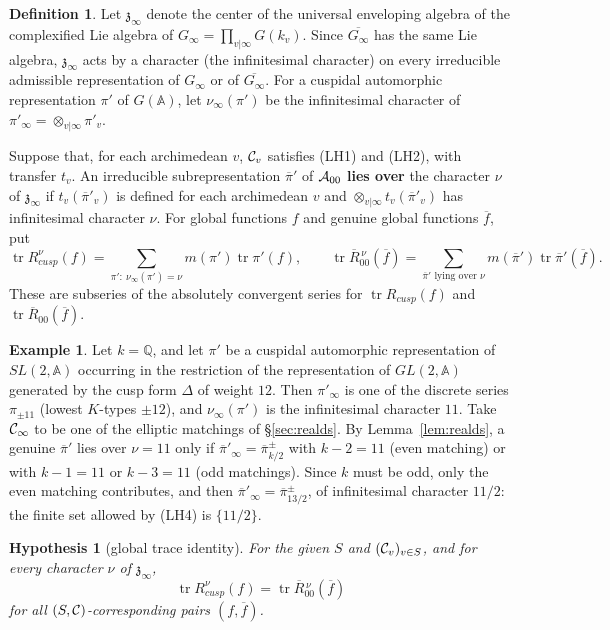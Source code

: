 \documentclass[12pt,letterpaper,openany]{book}
\theoremstyle{plain}
\newtheorem{hypothesis}[theorem]{Hypothesis}
\theoremstyle{definition}
\newtheorem{definition}[theorem]{Definition}
\newtheorem{example}[theorem]{Example}
\theoremstyle{remark}
\theoremstyle{remark}
\newcommand{\tr}{\operatorname{tr}}
\begin{document}
\begin{definition}\label{def:infchar}
Let $\mathfrak{z}_\infty$ denote the center of the universal enveloping
algebra of the complexified Lie algebra of
$G_\infty=\prod_{v|\infty}G(k_v)$. Since $\overline{G_\infty}$ has the same
Lie algebra, $\mathfrak{z}_\infty$ acts by a character (the infinitesimal
character) on every irreducible admissible representation of $G_\infty$
or of $\overline{G_\infty}$. For a cuspidal automorphic representation
$\pi'$ of $G({\mathbb{A}})$, let $\nu_\infty(\pi')$ be the infinitesimal
character of $\pi'_\infty=\otimes_{v|\infty}\pi'_v$.

Suppose that, for each archimedean $v$, ${\cal C}_v$ satisfies (LH1) and
(LH2), with transfer $t_v$. An irreducible subrepresentation
$\overline\pi'$ of ${\cal A}_{00}$ {\bf lies over} the
character $\nu$ of $\mathfrak{z}_\infty$ if $t_v(\overline\pi'_v)$ is
defined for each archimedean $v$ and $\otimes_{v|\infty}t_v(\overline\pi'_v)$
has infinitesimal character $\nu$. For global functions $f$ and genuine
global functions $\overline f$, put
\[
\tr R_{cusp}^\nu(f)=\sum_{\pi':\ \nu_\infty(\pi')=\nu}m(\pi')\tr\pi'(f),
\qquad
\tr \overline{R}{}_{00}^{\,\nu}(\overline f)=
\sum_{\overline\pi'\text{ lying over }\nu}m(\overline\pi')\tr\overline\pi'(\overline f).
\]
These are subseries of the absolutely convergent series for
$\tr R_{cusp}(f)$ and $\tr\overline R_{00}(\overline f)$.
\end{definition}

\begin{example}
Let $k={\mathbb Q}$, and let $\pi'$ be a cuspidal automorphic
representation of $SL(2,{\mathbb A})$ occurring in the restriction of the
representation of $GL(2,{\mathbb A})$ generated by the cusp form $\Delta$
of weight $12$. Then $\pi'_\infty$ is one of the discrete series
$\pi_{\pm11}$ (lowest $K$-types $\pm12$), and $\nu_\infty(\pi')$ is the
infinitesimal character $11$. Take ${\cal C}_\infty$ to be one of the
elliptic matchings of \S\ref{sec:realds}. By Lemma~\ref{lem:realds}, a
genuine $\overline\pi'$ lies over $\nu=11$ only if
$\overline\pi'_\infty=\overline\pi{}^{\pm}_{k/2}$ with $k-2=11$ (even
matching) or with $k-1=11$ or $k-3=11$ (odd matchings). Since $k$ must
be odd, only the even matching contributes, and then
$\overline\pi'_\infty=\overline\pi{}^{\pm}_{13/2}$, of infinitesimal
character $11/2$: the finite set allowed by (LH4) is $\{11/2\}$.
\end{example}

\begin{hypothesis}[global trace identity]\label{hyp:GH}
For the given $S$ and $({\cal C}_v)_{v\in S}$, and for every character
$\nu$ of $\mathfrak{z}_\infty$,
\[
\tr R_{cusp}^\nu(f)=\tr \overline{R}{}_{00}^{\,\nu}(\overline{f})
\]
for all $(S,{\cal C})$-corresponding pairs $(f,\overline{f})$.
\end{hypothesis}
\end{document}
